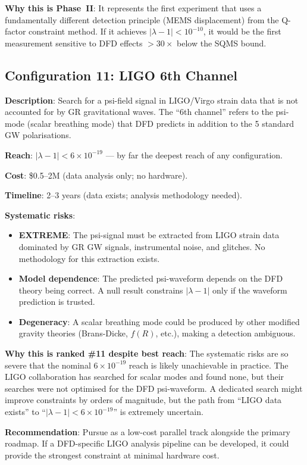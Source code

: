 \documentclass[11pt]{article}
\theoremstyle{definition}
\theoremstyle{remark}
\newcommand{\ee}[1]{\times 10^{#1}}
\newcommand{\lamdiff}{|\lambda-1|}
\begin{document}
\textbf{Why this is Phase~II}: It represents the first experiment that
uses a fundamentally different detection principle (MEMS displacement)
from the Q-factor constraint method. If it achieves $\lamdiff < 10^{-10}$,
it would be the first measurement sensitive to DFD effects $>30\times$
below the SQMS bound.

\subsection{Configuration 11: LIGO 6th Channel}

\textbf{Description}: Search for a psi-field signal in LIGO/Virgo
strain data that is not accounted for by GR gravitational waves.
The ``6th channel'' refers to the psi-mode (scalar breathing mode)
that DFD predicts in addition to the 5 standard GW polarisations.

\textbf{Reach}: $\lamdiff < 6\ee{-19}$ --- by far the deepest reach
of any configuration.

\textbf{Cost}: \$0.5--2M (data analysis only; no hardware).

\textbf{Timeline}: 2--3 years (data exists; analysis methodology needed).

\textbf{Systematic risks}:
\begin{itemize}[nosep]
\item \textbf{EXTREME}: The psi-signal must be extracted from LIGO strain
  data dominated by GR GW signals, instrumental noise, and glitches.
  No methodology for this extraction exists.
\item \textbf{Model dependence}: The predicted psi-waveform depends on the
  DFD theory being correct. A null result constrains $\lamdiff$ only if
  the waveform prediction is trusted.
\item \textbf{Degeneracy}: A scalar breathing mode could be produced by
  other modified gravity theories (Brans-Dicke, $f(R)$, etc.), making
  a detection ambiguous.
\end{itemize}

\textbf{Why this is ranked \#11 despite best reach}: The systematic risks
are so severe that the nominal $6\ee{-19}$ reach is likely
unachievable in practice. The LIGO collaboration has searched for scalar
modes and found none, but their searches were not optimised for the
DFD psi-waveform. A dedicated search might improve constraints by
orders of magnitude, but the path from ``LIGO data exists'' to
``$\lamdiff < 6\ee{-19}$'' is extremely uncertain.

\textbf{Recommendation}: Pursue as a low-cost parallel track alongside
the primary roadmap. If a DFD-specific LIGO analysis pipeline can be
developed, it could provide the strongest constraint at minimal hardware
cost.
\end{document}
